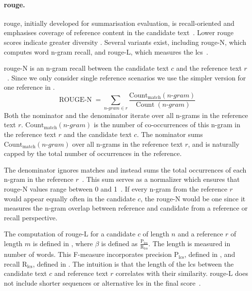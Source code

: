 
\paragraph{\ac{rouge}.}
\ac{rouge}, initially developed for summarisation evaluation, is recall-oriented and emphasises coverage of reference content in the candidate text~\citep{lin_rouge_2004}. 
Lower \ac{rouge} scores indicate greater diversity \citep{kurt_pehlivanoglu_comparative_2024}.
Several variants exist, including \ac{rouge}-N, which computes word n-gram recall, and \ac{rouge}-L, which measures the \ac{lcs}~\citep{zhou_paraphrase_2021,palivela_optimization_2021,kurt_pehlivanoglu_comparative_2024}. 

\ac{rouge}-N is an n-gram recall between the candidate text $c$ and the reference text $r$~\citep{lin_rouge_2004}.
Since we only consider single reference scenarios we use the simpler version for one reference in .
\begin{equation}
    \operatorname{ROUGE-N} = \sum_{n \text{-} gram \in r} \frac{\operatorname{Count_{match}}(n \text{-} gram)}{\operatorname{Count}(n \text{-} gram)}
\label{eq:rouge_n}
\end{equation}
Both the nominator and the denominator iterate over all n-grams in the reference text $r$.
$\operatorname{Count_{match}}(n \text{-} gram)$ is the number of co-occurrences of this n-gram in the reference text $r$ and the candidate text $c$.
The nominator sums $\operatorname{Count_{match}}(n \text{-} gram)$ over all n-grams in the reference text $r$, and is naturally capped by the total number of occurrences in the reference.

The denominator ignores matches and instead sums the total occurrences of each n-gram in the reference $r$~\citep{lin_rouge_2004}. 
This sum serves as a normalizer which ensures that \ac{rouge}-N values range between 0 and 1~\citep{kurt_pehlivanoglu_comparative_2024}.
%
If every n-gram from the reference $r$ would appear equally often in the candidate $c$, the \ac{rouge}-N would be one since it measures the n-gram overlap between reference and candidate from a reference or recall perspective.


The computation of \ac{rouge}-L for a candidate $c$ of length $n$ and a reference $r$ of length $m$ is defined in , where $\beta$ is defined as $\frac{\mathrm{P_{lcs}}}{\mathrm{R_{lcs}}}$.
The length is measured in number of words.
This F-measure incorporates precision $\mathrm{P_{lcs}}$, defined in , and recall $\mathrm{R_{lcs}}$, defined in .
The intuition is that the length of the \ac{lcs} between the candidate text $c$ and reference text $r$ correlates with their similarity.
\ac{rouge}-L does not include shorter sequences or alternative \ac{lcs} in the final score~\citep{lin_rouge_2004}.

